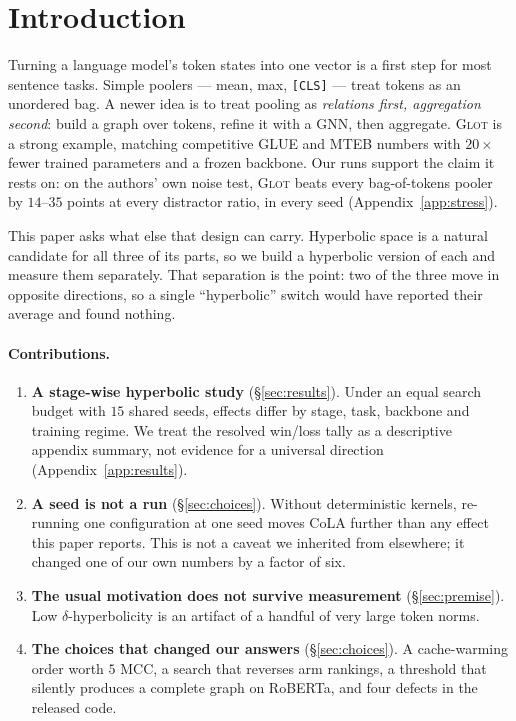\documentclass{article}
\begin{document}
\section{Introduction}

Turning a language model's token states into one vector is a first step for
most sentence tasks. Simple poolers --- mean, max, \texttt{[CLS]} --- treat
tokens as an unordered bag. A newer idea is to treat pooling as \emph{relations
first, aggregation second}: build a graph over tokens, refine it with a GNN,
then aggregate. \textsc{Glot} \citep{mantri2026glot} is a strong example,
matching competitive GLUE and MTEB numbers with $20\times$ fewer trained
parameters and a frozen backbone. Our runs support the claim it rests on: on
the authors' own noise test, \textsc{Glot} beats every bag-of-tokens pooler by
$14$--$35$ points at every distractor ratio, in every seed
(Appendix~\ref{app:stress}).

This paper asks what else that design can carry. Hyperbolic space is a natural
candidate for all three of its parts, so we build a hyperbolic version of each
and measure them separately. That separation is the point: two of the three
move in opposite directions, so a single ``hyperbolic'' switch would have
reported their average and found nothing.

\paragraph{Contributions.}
\begin{enumerate}
\itemsep1pt
\item \textbf{A stage-wise hyperbolic study} (\S\ref{sec:results}). Under an
      equal search budget with $15$ shared seeds, effects differ by stage,
      task, backbone and training regime. We treat the resolved win/loss tally
      as a descriptive appendix summary, not evidence for a universal direction
      (Appendix~\ref{app:results}).
\item \textbf{A seed is not a run} (\S\ref{sec:choices}). Without deterministic
      kernels, re-running one configuration at one seed moves CoLA further than
      any effect this paper reports. This is not a caveat we inherited from
      elsewhere; it changed one of our own numbers by a factor of six.
\item \textbf{The usual motivation does not survive measurement}
      (\S\ref{sec:premise}). Low $\delta$-hyperbolicity is an artifact of a
      handful of very large token norms.
\item \textbf{The choices that changed our answers} (\S\ref{sec:choices}). A
      cache-warming order worth $5$ MCC, a search that reverses arm rankings, a
      threshold that silently produces a complete graph on RoBERTa, and four
      defects in the released code.
\end{enumerate}
\end{document}
